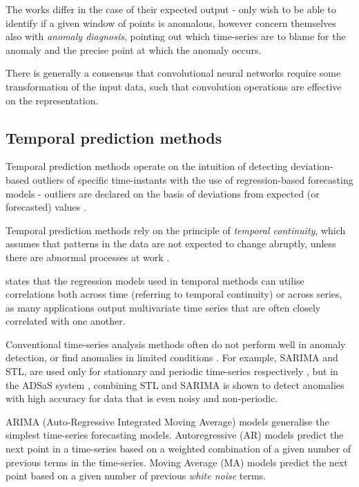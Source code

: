 \documentclass{mpaper}
\begin{document}
The works differ in the case of their expected output - \cite{MicrosoftTimeSeries} only wish to be able to identify if a given window of points is anomalous, however \cite{deepMultivariateNetwork} concern themselves also with \textit{anomaly diagnosis}, pointing out which time-series are to blame for the anomaly and the precise point at which the anomaly occurs.

There is generally a consensus that convolutional neural networks require some transformation of the input data, such that convolution operations are effective on the representation.

\subsection{Temporal prediction methods}
\label{section:temporal-prediction-related-work}

Temporal prediction methods operate on the intuition of detecting deviation-based outliers of specific time-instants with the use of regression-based forecasting models - outliers are declared on the basis of deviations from expected (or forecasted) values \citep{outlierAnalysisBook}.

Temporal prediction methods rely on the principle of \textit{temporal continuity}, which assumes that patterns in the data are not expected to change abruptly, unless there are abnormal processes at work \citep{outlierAnalysisBook}.

\cite{outlierAnalysisBook} states that the regression models used in temporal methods can utilise correlations both across time (referring to temporal continuity) or across series, as many applications output multivariate time series that are often closely correlated with one another.

Conventional time-series analysis methods often do not perform well in anomaly detection, or find anomalies in limited conditions \citep{ADSaS}. For example, SARIMA and STL, are used only for stationary and periodic time-series respectively \citep{ADSaS}, but in the ADSaS system \citep{ADSaS}, combining STL and SARIMA is shown to detect anomalies with high accuracy for data that is even noisy and non-periodic.

ARIMA (Auto-Regressive Integrated Moving Average) models generalise the simplest time-series forecasting models. Autoregressive (AR) models predict the next point in a time-series based on a weighted combination of a given number of previous terms in the time-series. Moving Average (MA) models predict the next point based on a given number of previous \textit{white noise} terms.
\end{document}
